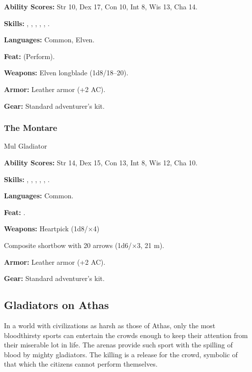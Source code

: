 \textbf{Ability Scores:} Str 10, Dex 17, Con 10, Int 8, Wis 13, Cha 14.

\textbf{Skills:} , , , , , .

\textbf{Languages:} Common, Elven.

\textbf{Feat:}  (Perform).

\textbf{Weapons:} Elven longblade (1d8/18--20).

\textbf{Armor:} Leather armor (+2 AC).

\textbf{Gear:} Standard adventurer's kit.

\subsubsection{The Montare}
Mul Gladiator

\textbf{Ability Scores:} Str 14, Dex 15, Con 13, Int 8, Wis 12, Cha 10.

\textbf{Skills:} , , , , , .

\textbf{Languages:} Common.

\textbf{Feat:} .

\textbf{Weapons:} Heartpick (1d8/$\times$4)

Composite shortbow with 20 arrows (1d6/$\times$3, 21 m).

\textbf{Armor:} Leather armor (+2 AC).

\textbf{Gear:} Standard adventurer's kit.

\subsection{Gladiators on Athas}

In a world with civilizations as harsh as those of Athas, only the most bloodthirsty sports can entertain the crowds enough to keep their attention from their miserable lot in life. The arenas provide such sport with the spilling of blood by mighty gladiators. The killing is a release for the crowd, symbolic of that which the citizens cannot perform themselves.

